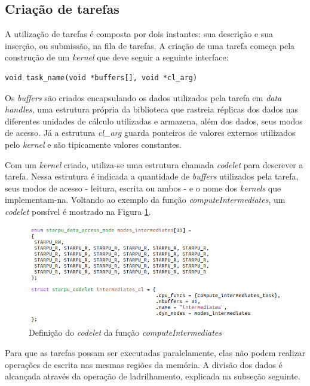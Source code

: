 \documentclass[cic,tc]{iiufrgs}
\begin{document}
\subsection{Criação de tarefas}

A utilização de tarefas é composta por dois instantes: sua descrição e sua inserção, ou submissão, na fila de tarefas. A criação de uma tarefa começa pela construção de um \textit{kernel}
que deve seguir a seguinte interface:

\begin{verbatim}
void task_name(void *buffers[], void *cl_arg)
\end{verbatim}

Os \textit{buffers} são criados encapsulando os dados utilizados pela tarefa em \textit{data handles}, uma estrutura própria da biblioteca que rastreia réplicas dos dados nas diferentes
unidades de cálculo utilizadas e armazena, além dos dados, seus modos de acesso. Já a estrutura \textit{cl\_arg} guarda ponteiros de valores externos utilizados pelo \textit{kernel}
e são tipicamente valores constantes.

Com um \textit{kernel} criado, utiliza-se uma estrutura chamada \textit{codelet} para descrever a tarefa. Nessa estrutura é indicada a quantidade de \textit{buffers} utilizados
pela tarefa, seus modos de acesso - leitura, escrita ou ambos - e o nome dos \textit{kernels} que implementam-na. Voltando ao exemplo da função \textit{computeIntermediates}, um \textit{codelet}
possível é mostrado na Figura \ref{fig:intermediates_cl}.

\begin{figure}[!htb]
    \caption{Definição do \textit{codelet} da função \textit{computeIntermediates}}
    \begin{center}
      \includegraphics[width=32em]{intermediates_cl}
    \end{center}
    \label{fig:intermediates_cl}
\end{figure}

Para que as tarefas possam ser executadas paralelamente, elas não podem realizar operações de escrita nas mesmas regiões da memória. A divisão dos dados é alcançada através da operação de
ladrilhamento, explicada na subseção seguinte.
\end{document}
